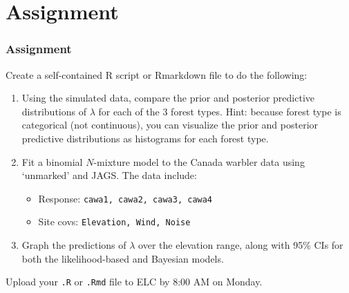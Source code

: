 \documentclass[color=usenames,dvipsnames]{beamer}\usepackage[]{graphicx}\usepackage[]{xcolor}
\begin{document}
\section{Assignment}




\begin{frame}[fragile]
  \frametitle{Assignment}
  \footnotesize
  Create a self-contained R script or Rmarkdown file
  to do the following:
  \vfill
  \begin{enumerate}
    \footnotesize
    \item Using the simulated data, compare the prior and posterior
      predictive distributions of $\lambda$ for each of the 3 forest
      types. Hint: because forest type is categorical (not
      continuous), you can visualize the prior and posterior
      predictive distributions as histograms for each forest type.  
    \item Fit a binomial $N$-mixture model to the Canada warbler data
      using `unmarked' and JAGS. The data include: 
      \begin{itemize}
        \footnotesize
        \item Response: \texttt{cawa1, cawa2, cawa3, cawa4}
        \item Site covs: \texttt{Elevation, Wind, Noise}
      \end{itemize}
    \item Graph the predictions of $\lambda$ over the 
      elevation range, along with 95\% CIs for both the likelihood-based and  
      Bayesian models.  
  \end{enumerate}
  \vfill
  Upload your {\tt .R} or {\tt .Rmd} file to ELC by 8:00 AM on Monday. 
\end{frame}
\end{document}

